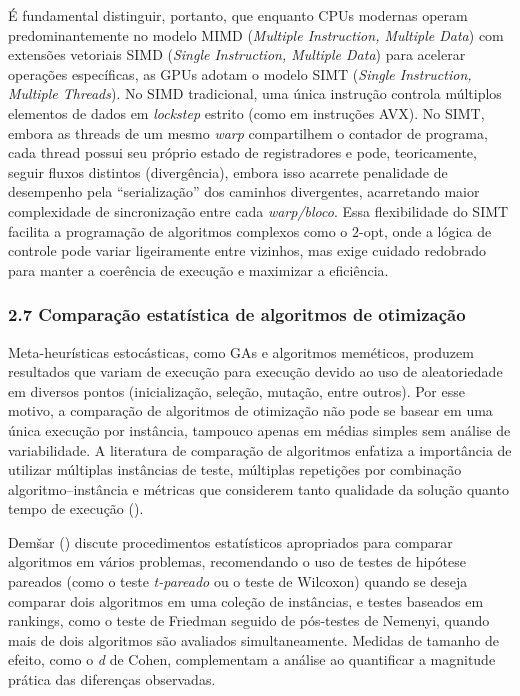 É fundamental distinguir, portanto, que enquanto CPUs modernas operam
predominantemente no modelo MIMD (\emph{Multiple Instruction, Multiple
Data}) com extensões vetoriais SIMD (\emph{Single Instruction, Multiple
Data}) para acelerar operações específicas, as GPUs adotam o modelo SIMT
(\emph{Single Instruction, Multiple Threads}). No SIMD tradicional, uma
única instrução controla múltiplos elementos de dados em \emph{lockstep}
estrito (como em instruções AVX). No SIMT, embora as threads de um mesmo
\emph{warp} compartilhem o contador de programa, cada thread possui seu
próprio estado de registradores e pode, teoricamente, seguir fluxos
distintos (divergência), embora isso acarrete penalidade de desempenho
pela ``serialização'' dos caminhos divergentes, acarretando maior
complexidade de sincronização entre cada \emph{warp/bloco}. Essa
flexibilidade do SIMT facilita a programação de algoritmos complexos
como o \(2\)-opt, onde a lógica de controle pode variar ligeiramente
entre vizinhos, mas exige cuidado redobrado para manter a coerência de
execução e maximizar a eficiência.

\subsubsection{2.7 Comparação estatística de algoritmos de
otimização}\label{sec-27-comparacao-estatistica}

Meta-heurísticas estocásticas, como GAs e algoritmos meméticos, produzem
resultados que variam de execução para execução devido ao uso de
aleatoriedade em diversos pontos (inicialização, seleção, mutação, entre
outros). Por esse motivo, a comparação de algoritmos de otimização não
pode se basear em uma única execução por instância, tampouco apenas em
médias simples sem análise de variabilidade. A literatura de comparação
de algoritmos enfatiza a importância de utilizar múltiplas instâncias de
teste, múltiplas repetições por combinação algoritmo--instância e
métricas que considerem tanto qualidade da solução quanto tempo de
execução ().

Demšar () discute procedimentos
estatísticos apropriados para comparar algoritmos em vários problemas,
recomendando o uso de testes de hipótese pareados (como o teste
\emph{t-pareado} ou o teste de Wilcoxon) quando se deseja comparar dois
algoritmos em uma coleção de instâncias, e testes baseados em rankings,
como o teste de Friedman seguido de pós-testes de Nemenyi, quando mais
de dois algoritmos são avaliados simultaneamente. Medidas de tamanho de
efeito, como o \emph{d} de Cohen, complementam a análise ao quantificar
a magnitude prática das diferenças observadas.

